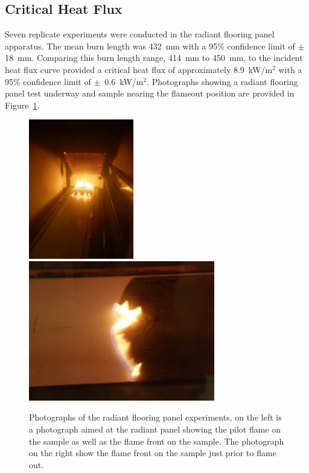 \documentclass[twoside]{uocthesis}
\begin{document}
\subsection{Critical Heat Flux}

Seven replicate experiments were conducted in the radiant flooring panel apparatus.  The mean burn length was 432~mm with a 95$\%$ confidence limit of $\pm$18~mm. Comparing this burn length range, 414~mm to 450~mm, to the incident heat flux curve provided a critical heat flux of approximately 8.9~kW/m$^2$ with a 95$\%$ confidence limit of $\pm$~0.6~kW/m$^2$.  Photographs showing a radiant flooring panel test underway and sample nearing the flameout position are provided in Figure~\ref{FRP_Test_Photos}. 

\begin{figure}
	\centering
	\includegraphics[width=1.8in]{../Figures/FRP_Test_Photo1}
	\includegraphics[width=3.2in]{../Figures/FRP_Test_Photo2} \\
	\caption[Photographs of the radiant flooring panel experiments]{Photographs of the radiant flooring panel experiments, on the left is a photograph aimed at the radiant panel showing the pilot flame on the sample as well as the flame front on the sample.  The photograph on the right show the flame front on the sample just prior to flame out.}
	\label{FRP_Test_Photos}
\end{figure}
\end{document}
